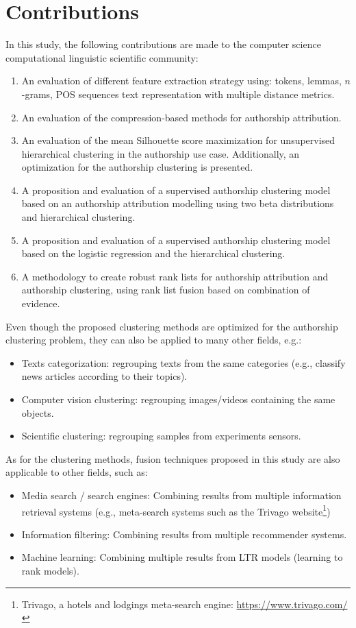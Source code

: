 \section{Contributions}

In this study, the following contributions are made to the computer science computational linguistic scientific community:

\begin{enumerate}
  \item
  An evaluation of different feature extraction strategy using: tokens, lemmas, $n$-grams, POS sequences text representation with multiple distance metrics.
  \item
  An evaluation of the compression-based methods for authorship attribution.
  \item
  An evaluation of the mean Silhouette score maximization for unsupervised hierarchical clustering in the authorship use case. Additionally, an optimization for the authorship clustering is presented.
  \item
  A proposition and evaluation of a supervised authorship clustering model based on an authorship attribution modelling using two beta distributions and hierarchical clustering.
  \item
  A proposition and evaluation of a supervised authorship clustering model based on the logistic regression and the hierarchical clustering.
  \item
  A methodology to create robust rank lists for authorship attribution and authorship clustering, using rank list fusion based on combination of evidence.
\end{enumerate}

Even though the proposed clustering methods are optimized for the authorship clustering problem, they can also be applied to many other fields, e.g.:
\begin{itemize}
  \item
  Texts categorization: regrouping texts from the same categories (e.g., classify news articles according to their topics).
  \item
  Computer vision clustering: regrouping images/videos containing the same objects.
  \item
  Scientific clustering: regrouping samples from experiments sensors.
\end{itemize}

As for the clustering methods, fusion techniques proposed in this study are also applicable to other fields, such as:
\begin{itemize}
  \item
  Media search / search engines: Combining results from multiple information retrieval systems (e.g., meta-search systems such as the Trivago website\footnote{Trivago, a hotels and lodgings meta-search engine: \url{https://www.trivago.com/}})
  \item
  Information filtering: Combining results from multiple recommender systems.
  \item
  Machine learning: Combining multiple results from LTR models (learning to rank models).
\end{itemize}
